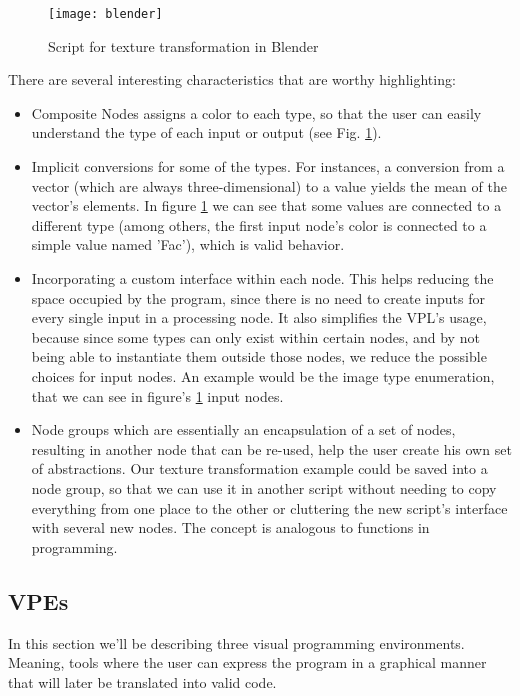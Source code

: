 \begin{itemsize}
\begin{figure}[t]
  \begin{center}
    \leavevmode
    \texttt{[image: blender]}
    \caption{Script for texture transformation in Blender \cite{blender}}
    \label{fig:blender}
  \end{center}
\end{figure}

There are several interesting characteristics that are worthy highlighting:
\begin{itemize}
  \item Composite Nodes assigns a color to each type, so that the user can
easily understand the type of each input or output (see Fig. \ref{fig:blender}).
  \item Implicit conversions for some of the types. For instances,
a conversion from a vector (which are always three-dimensional) to a value yields
the mean of the vector's elements. In figure \ref{fig:blender} we can see that
some values are connected to a different type (among others, the first input
node's color is connected to a simple value named 'Fac'), which is valid behavior.
  \item Incorporating a custom interface within each node. This helps reducing
the space occupied by the program, since there is no need to create inputs for
every single input in a processing node. It also simplifies the VPL's usage,
because since some types can only exist within certain nodes, and by not being
able to instantiate them outside those nodes, we reduce the possible choices
for input nodes. An example would be the image type enumeration, that we can
see in figure's \ref{fig:blender} input nodes.
  \item Node groups which are essentially an encapsulation
of a set of nodes, resulting in another node that can be re-used, help the user
create his own set of abstractions. Our texture transformation example could
be saved into a node group, so that we can use it in another script without
needing to copy everything from one place to the other or cluttering the new
script's interface with several new nodes. The concept is analogous to functions
in programming.
\end{itemize}

\subsection{VPEs}

In this section we'll be describing three visual programming environments. Meaning,
tools where the user can express the program in a graphical manner that will
later be translated into valid code.


\end{itemsize}

